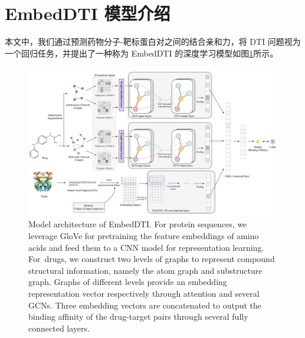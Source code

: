 \begin{table}[!htbp]
\centering
{}
\caption{Davis 和 KIBA 数据集}
\label{table:dti_datasets}
\end{table}

\section{EmbedDTI 模型介绍} \label{5.2}
本文中，我们通过预测药物分子-靶标蛋白对之间的结合亲和力，将 DTI 问题视为一个回归任务，并提出了一种称为 EmbedDTI 的深度学习模型如图\ref{fig:EmbedDTI}所示。

\begin{figure}[!htbp] 
\centering
\includegraphics[width=1\textwidth]  {imgs/model.png}
        {Model architecture of EmbedDTI. For protein sequences, we leverage GloVe for pretraining the feature embeddings of amino acids and feed them to a CNN model for representation learning. For~drugs, we construct two levels of graphs to represent compound structural information, namely the atom graph and substructure graph. Graphs of different levels provide an embedding representation vector respectively through attention and several GCNs. Three embedding vectors are concatenated to output the binding affinity of the drug-target pairs through several fully connected layers.}
\label{fig:EmbedDTI}
\end{figure}

